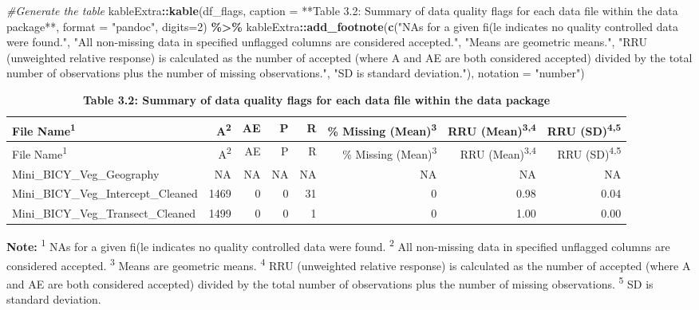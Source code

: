 \documentclass[
]{article}
\newenvironment{Shaded}{\begin{snugshade}}{\end{snugshade}}
\newcommand{\AttributeTok}[1]{\textcolor[rgb]{0.13,0.29,0.53}{#1}}
\newcommand{\CommentTok}[1]{\textcolor[rgb]{0.56,0.35,0.01}{\textit{#1}}}
\newcommand{\DecValTok}[1]{\textcolor[rgb]{0.00,0.00,0.81}{#1}}
\newcommand{\FunctionTok}[1]{\textcolor[rgb]{0.13,0.29,0.53}{\textbf{#1}}}
\newcommand{\NormalTok}[1]{#1}
\newcommand{\SpecialCharTok}[1]{\textcolor[rgb]{0.81,0.36,0.00}{\textbf{#1}}}
\newcommand{\StringTok}[1]{\textcolor[rgb]{0.31,0.60,0.02}{#1}}
\begin{document}
\begin{Shaded}
\begin{Highlighting}[]
\CommentTok{\#Generate the table}
\NormalTok{kableExtra}\SpecialCharTok{::}\FunctionTok{kable}\NormalTok{(df\_flags, }\AttributeTok{caption =} \StringTok{\textquotesingle{}**Table 3.2: Summary of data quality flags for each data file within the data package**\textquotesingle{}}\NormalTok{, }\AttributeTok{format =} \StringTok{"pandoc"}\NormalTok{, }\AttributeTok{digits=}\DecValTok{2}\NormalTok{) }\SpecialCharTok{\%\textgreater{}\%}
\NormalTok{kableExtra}\SpecialCharTok{::}\FunctionTok{add\_footnote}\NormalTok{(}\FunctionTok{c}\NormalTok{(}\StringTok{"NAs for a given fi(le indicates no quality controlled data were found."}\NormalTok{,}
               \StringTok{"All non{-}missing data in specified unflagged columns are considered accepted."}\NormalTok{,}
               \StringTok{"Means are geometric means."}\NormalTok{,}
               \StringTok{"RRU (unweighted relative response) is calculated as the number of accepted (where A and AE are both considered accepted) divided by the total number of observations plus the number of missing observations."}\NormalTok{, }
               \StringTok{"SD is standard deviation."}\NormalTok{), }\AttributeTok{notation =} \StringTok{"number"}\NormalTok{)}
\end{Highlighting}
\end{Shaded}

\begin{longtable}[]{@{}lrrrrrrr@{}}
\caption{\textbf{Table 3.2: Summary of data quality flags for each data
file within the data package}}\tabularnewline
\toprule\noalign{}
File Name\textsuperscript{1} & A\textsuperscript{2} & AE & P & R & \%
Missing (Mean)\textsuperscript{3} & RRU (Mean)\textsuperscript{3,4} &
RRU (SD)\textsuperscript{4,5} \\
\midrule\noalign{}
\endfirsthead
\toprule\noalign{}
File Name\textsuperscript{1} & A\textsuperscript{2} & AE & P & R & \%
Missing (Mean)\textsuperscript{3} & RRU (Mean)\textsuperscript{3,4} &
RRU (SD)\textsuperscript{4,5} \\
\midrule\noalign{}
\endhead
\bottomrule\noalign{}
\endlastfoot
Mini\_BICY\_Veg\_Geography & NA & NA & NA & NA & NA & NA & NA \\
Mini\_BICY\_Veg\_Intercept\_Cleaned & 1469 & 0 & 0 & 31 & 0 & 0.98 &
0.04 \\
Mini\_BICY\_Veg\_Transect\_Cleaned & 1499 & 0 & 0 & 1 & 0 & 1.00 &
0.00 \\
\end{longtable}

\textbf{Note:} \textsuperscript{1} NAs for a given fi(le indicates no
quality controlled data were found. \textsuperscript{2} All non-missing
data in specified unflagged columns are considered accepted.
\textsuperscript{3} Means are geometric means. \textsuperscript{4} RRU
(unweighted relative response) is calculated as the number of accepted
(where A and AE are both considered accepted) divided by the total
number of observations plus the number of missing observations.
\textsuperscript{5} SD is standard deviation.
\end{document}
